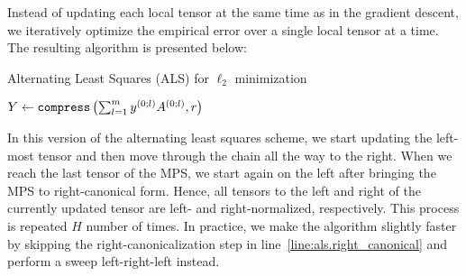 Instead of updating each local tensor at the same time as in the gradient descent, we iteratively optimize the empirical error over a single local tensor at a time.
The resulting algorithm is presented below:

\begin{algorithm}[H]
  \caption{\label{alg:als}Alternating Least Squares (ALS) for $\ell_2$ minimization}

  \BlankLine

  $Y \gets \mathtt{compress}\left(\sum_{l=1}^m y^{(0;l)} A^{(0;l)}, r\right)$ \label{line:als.initialization}


\end{algorithm}

In this version of the alternating least squares scheme, we start updating the left-most tensor and then move through the chain all the way to the right.
When we reach the last tensor of the MPS, we start again on the left after bringing the MPS to right-canonical form.
Hence, all tensors to the left and right of the currently updated tensor are left- and right-normalized, respectively.
This process is repeated $H$ number of times.
In practice, we make the algorithm slightly faster by skipping the right-canonicalization step in line~\ref{line:als.right_canonical} and perform a sweep left-right-left instead.

